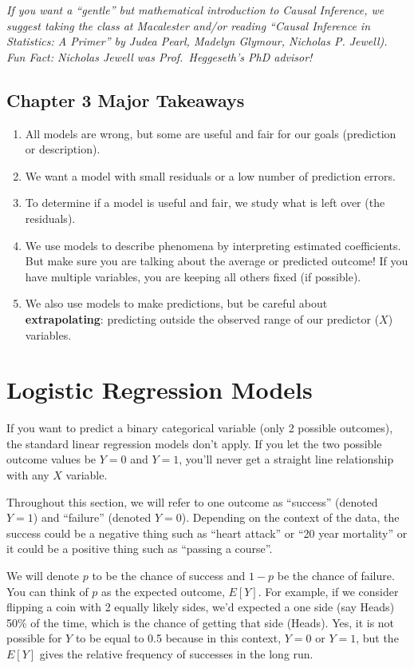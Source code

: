 \documentclass[
]{book}
\begin{document}
\emph{If you want a ``gentle'' but mathematical introduction to Causal Inference, we suggest taking the class at Macalester and/or reading ``Causal Inference in Statistics: A Primer'' by Judea Pearl, Madelyn Glymour, Nicholas P. Jewell). Fun Fact: Nicholas Jewell was Prof.~Heggeseth's PhD advisor!}

\section{Chapter 3 Major Takeaways}\label{chapter-3-major-takeaways}

\begin{enumerate}
\def\labelenumi{\arabic{enumi}.}
\item
  All models are wrong, but some are useful and fair for our goals (prediction or description).
\item
  We want a model with small residuals or a low number of prediction errors.
\item
  To determine if a model is useful and fair, we study what is left over (the residuals).
\item
  We use models to describe phenomena by interpreting estimated coefficients. But make sure you are talking about the average or predicted outcome! If you have multiple variables, you are keeping all others fixed (if possible).
\item
  We also use models to make predictions, but be careful about \textbf{extrapolating}: predicting outside the observed range of our predictor (\(X\)) variables.
\end{enumerate}

\chapter{Logistic Regression Models}\label{logistic}

If you want to predict a binary categorical variable (only 2 possible outcomes), the standard linear regression models don't apply. If you let the two possible outcome values be \(Y=0\) and \(Y=1\), you'll never get a straight line relationship with any \(X\) variable.

Throughout this section, we will refer to one outcome as ``success'' (denoted \(Y=1\)) and ``failure'' (denoted \(Y=0\)). Depending on the context of the data, the success could be a negative thing such as ``heart attack'' or ``20 year mortality'' or it could be a positive thing such as ``passing a course''.

We will denote \(p\) to be the chance of success and \(1-p\) be the chance of failure. You can think of \(p\) as the expected outcome, \(E[Y]\). For example, if we consider flipping a coin with 2 equally likely sides, we'd expected a one side (say Heads) 50\% of the time, which is the chance of getting that side (Heads). Yes, it is not possible for \(Y\) to be equal to 0.5 because in this context, \(Y=0\) or \(Y=1\), but the \(E[Y]\) gives the relative frequency of successes in the long run.
\end{document}
